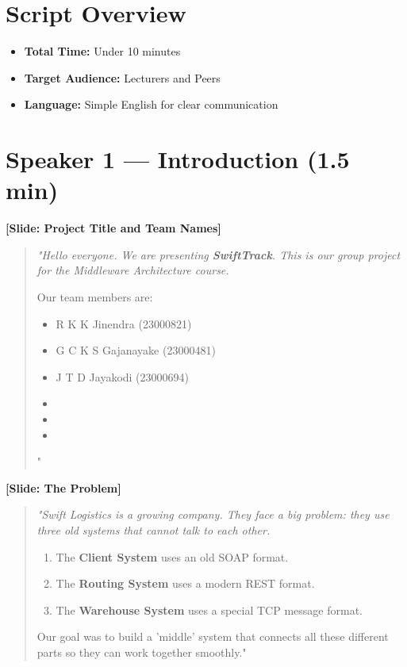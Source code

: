 \documentclass[12pt,a4paper]{article}
\newenvironment{scriptquote}
{\begin{quote}\itshape\color{navy!90}}
{\end{quote}}
\newcommand{\slideinfo}[1]{\noindent\textbf{\color{teal}[#1]}\medskip}
\begin{document}
\newpage

\section*{Script Overview}
\begin{itemize}
    \item \textbf{Total Time:} Under 10 minutes
    \item \textbf{Target Audience:} Lecturers and Peers
    \item \textbf{Language:} Simple English for clear communication
\end{itemize}

\section{Speaker 1 --- Introduction (1.5 min)}

\slideinfo{Slide: Project Title and Team Names}

\begin{scriptquote}
"Hello everyone. We are presenting \textbf{SwiftTrack}. This is our group project for the Middleware Architecture course.

Our team members are:
\begin{itemize}
    \item R K K Jinendra (23000821)
    \item G C K S Gajanayake (23000481)
    \item J T D Jayakodi (23000694)
    \item [Speaker 4 Name]
    \item [Speaker 5 Name]
    \item [Speaker 6 Name]
\end{itemize}
"
\end{scriptquote}

\slideinfo{Slide: The Problem}

\begin{scriptquote}
"Swift Logistics is a growing company. They face a big problem: they use three old systems that cannot talk to each other.

\begin{enumerate}
    \item The \textbf{Client System} uses an old SOAP format.
    \item The \textbf{Routing System} uses a modern REST format.
    \item The \textbf{Warehouse System} uses a special TCP message format.
\end{enumerate}

Our goal was to build a 'middle' system that connects all these different parts so they can work together smoothly."
\end{scriptquote}
\end{document}
